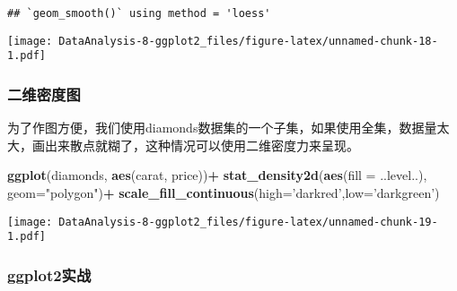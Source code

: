 \documentclass[]{article}
\newenvironment{Shaded}{\begin{snugshade}}{\end{snugshade}}
\newcommand{\KeywordTok}[1]{\textcolor[rgb]{0.13,0.29,0.53}{\textbf{#1}}}
\newcommand{\DataTypeTok}[1]{\textcolor[rgb]{0.13,0.29,0.53}{#1}}
\newcommand{\StringTok}[1]{\textcolor[rgb]{0.31,0.60,0.02}{#1}}
\newcommand{\OperatorTok}[1]{\textcolor[rgb]{0.81,0.36,0.00}{\textbf{#1}}}
\newcommand{\NormalTok}[1]{#1}
\begin{document}
\begin{verbatim}
## `geom_smooth()` using method = 'loess'
\end{verbatim}

\texttt{[image: DataAnalysis-8-ggplot2\_files/figure-latex/unnamed-chunk-18-1.pdf]}

\subsubsection{二维密度图}

为了作图方便，我们使用diamonds数据集的一个子集，如果使用全集，数据量太大，画出来散点就糊了，这种情况可以使用二维密度力来呈现。

\begin{Shaded}
\begin{Highlighting}[]
\KeywordTok{ggplot}\NormalTok{(diamonds, }\KeywordTok{aes}\NormalTok{(carat, price))}\OperatorTok{+}\StringTok{ }\KeywordTok{stat_density2d}\NormalTok{(}\KeywordTok{aes}\NormalTok{(}\DataTypeTok{fill =}\NormalTok{ ..level..), }\DataTypeTok{geom=}\StringTok{"polygon"}\NormalTok{)}\OperatorTok{+}\StringTok{ }\KeywordTok{scale_fill_continuous}\NormalTok{(}\DataTypeTok{high=}\StringTok{'darkred'}\NormalTok{,}\DataTypeTok{low=}\StringTok{'darkgreen'}\NormalTok{)}
\end{Highlighting}
\end{Shaded}

\texttt{[image: DataAnalysis-8-ggplot2\_files/figure-latex/unnamed-chunk-19-1.pdf]}

\subsubsection{ggplot2实战}\label{ggplot2}
\end{document}
